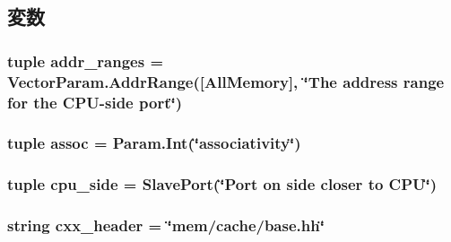 \subsection{変数}
\hypertarget{classBaseCache_1_1BaseCache_aa330ef4ab6a08f4d5d28427274cd4f68}{
\subsubsection[{addr\_\-ranges}]{\setlength{\rightskip}{0pt plus 5cm}tuple {\bf addr\_\-ranges} = VectorParam.AddrRange(\mbox{[}AllMemory\mbox{]}, \char`\"{}The address range for the CPU-\/side port\char`\"{})}}
\label{classBaseCache_1_1BaseCache_aa330ef4ab6a08f4d5d28427274cd4f68}
\hypertarget{classBaseCache_1_1BaseCache_a19c16ab1fbe2e2d958dbfd7213149cfc}{
\subsubsection[{assoc}]{\setlength{\rightskip}{0pt plus 5cm}tuple {\bf assoc} = Param.Int(\char`\"{}associativity\char`\"{})}}
\label{classBaseCache_1_1BaseCache_a19c16ab1fbe2e2d958dbfd7213149cfc}
\hypertarget{classBaseCache_1_1BaseCache_aba2a6f360ad513aac2a909e979db565c}{
\subsubsection[{cpu\_\-side}]{\setlength{\rightskip}{0pt plus 5cm}tuple {\bf cpu\_\-side} = {\bf SlavePort}(\char`\"{}Port on side closer to CPU\char`\"{})}}
\label{classBaseCache_1_1BaseCache_aba2a6f360ad513aac2a909e979db565c}
\hypertarget{classBaseCache_1_1BaseCache_a17da7064bc5c518791f0c891eff05fda}{
\subsubsection[{cxx\_\-header}]{\setlength{\rightskip}{0pt plus 5cm}string {\bf cxx\_\-header} = \char`\"{}mem/cache/base.hh\char`\"{}}}
\label{classBaseCache_1_1BaseCache_a17da7064bc5c518791f0c891eff05fda}


